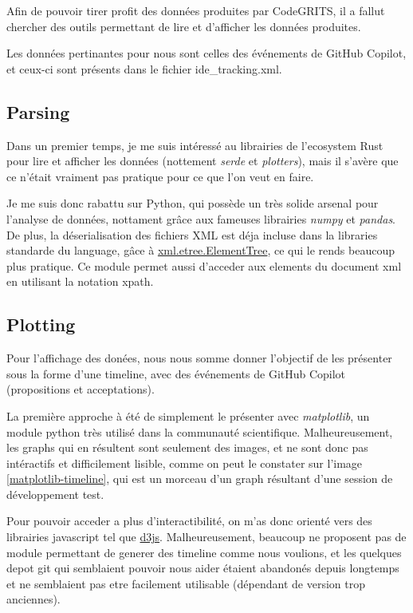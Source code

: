 Afin de pouvoir tirer profit des données produites par CodeGRITS, il a fallut chercher des outils permettant de lire et d'afficher les données produites.

Les données pertinantes pour nous sont celles des événements de GitHub Copilot, et ceux-ci sont présents dans le fichier ide\_tracking.xml.

\subsection{Parsing}

Dans un premier temps, je me suis intéressé au librairies de l'ecosystem Rust pour lire et afficher les données (nottement \emph{serde} et \emph{plotters}),
mais il s'avère que ce n'était vraiment pas pratique pour ce que l'on veut en faire.

Je me suis donc rabattu sur Python, qui possède un très solide arsenal pour l'analyse de données, nottament grâce aux fameuses librairies \emph{numpy} et \emph{pandas}.
De plus, la déserialisation des fichiers XML est déja incluse dans la libraries standarde du language, gâce à \href{https://docs.python.org/3/library/xml.etree.elementtree.html}{xml.etree.ElementTree},
ce qui le rends beaucoup plus pratique.
Ce module permet aussi d'acceder aux elements du document xml en utilisant la notation xpath.

\subsection{Plotting}

Pour l'affichage des donées, nous nous somme donner l'objectif de les présenter sous la forme d'une timeline, avec des événements de GitHub Copilot (propositions et acceptations).

La première approche à été de simplement le présenter avec \emph{matplotlib}, un module python très utilisé dans la communauté scientifique.
Malheureusement, les graphs qui en résultent sont seulement des images, et ne sont donc pas intéractifs et difficilement lisible, comme on peut le constater sur l'image \ref{matplotlib-timeline},
qui est un morceau d'un graph résultant d'une session de développement test.

Pour pouvoir acceder a plus d'interactibilité, on m'as donc orienté vers des librairies javascript tel que \href{https://d3js.org}{d3js}.
Malheureusement, beaucoup ne proposent pas de module permettant de generer des timeline comme nous voulions, et les quelques depot git qui semblaient pouvoir nous aider étaient abandonés depuis longtemps
et ne semblaient pas etre facilement utilisable (dépendant de version trop anciennes).

